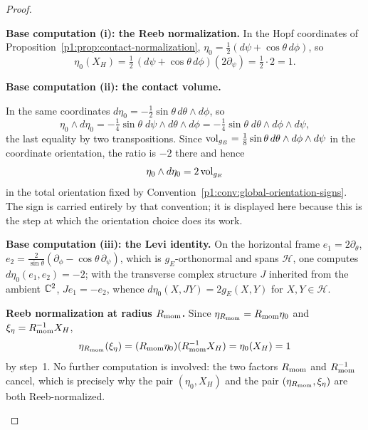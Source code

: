 \documentclass[11pt]{article}
\begin{document}
\begin{proof}

\begin{proofsteps}
\item \textbf{Base computation (i): the Reeb normalization.}
In the Hopf coordinates of Proposition~\ref{p1:prop:contact-normalization},
\(\eta_0=\tfrac12(d\psi+\cos\theta\,d\phi)\), so
\[
  \eta_0(X_H)=\tfrac12\,(d\psi+\cos\theta\,d\phi)(2\partial_\psi)=\tfrac12\cdot2=1 .
\]

\item \textbf{Base computation (ii): the contact volume.}\par
In the same coordinates \(d\eta_0=-\tfrac12\sin\theta\,d\theta\wedge d\phi\),
so
\[
  \eta_0\wedge d\eta_0
  =-\tfrac14\sin\theta\;d\psi\wedge d\theta\wedge d\phi
  =-\tfrac14\sin\theta\;d\theta\wedge d\phi\wedge d\psi ,
\]
the last equality by two transpositions.  Since
\(\operatorname{vol}_{g_E}=\tfrac18\sin\theta\,d\theta\wedge d\phi\wedge d\psi\) in the
coordinate orientation, the ratio is \(-2\) there and hence
\[
  \eta_0\wedge d\eta_0=2\operatorname{vol}_{g_E}
\]
in the total orientation fixed by
Convention~\ref{p1:conv:global-orientation-signs}.  The sign is carried
entirely by that convention; it is displayed here because this is the step at
which the orientation choice does its work.

\item \textbf{Base computation (iii): the Levi identity.}
On the horizontal frame
\(e_1=2\partial_\theta\), \(e_2=\tfrac{2}{\sin\theta}(\partial_\phi-\cos\theta\,\partial_\psi)\),
which is \(g_E\)-orthonormal and spans \(\mathcal H\), one computes
\(d\eta_0(e_1,e_2)=-2\); with the transverse complex structure \(J\) inherited
from the ambient \(\mathbb{C}^2\), \(Je_1=-e_2\), whence
\(d\eta_0(X,JY)=2g_E(X,Y)\) for \(X,Y\in\mathcal H\).

\item \textbf{Reeb normalization at radius \(R_{\mathrm{mom}}\).}
Since \(\eta_{R_{\mathrm{mom}}}=R_{\mathrm{mom}}\eta_0\) and \(\xi_\eta=R_{\mathrm{mom}}^{-1}X_H\),
\[
  \eta_{R_{\mathrm{mom}}}(\xi_\eta)
  =(R_{\mathrm{mom}}\eta_0)(R_{\mathrm{mom}}^{-1}X_H)
  =\eta_0(X_H)=1
\]
by step~1.  No further computation is involved: the two factors
\(R_{\mathrm{mom}}\) and \(R_{\mathrm{mom}}^{-1}\) cancel, which is precisely why the pair
\((\eta_0,X_H)\) and the pair \((\eta_{R_{\mathrm{mom}}},\xi_\eta)\) are both
Reeb-normalized.


\end{proofsteps}
\end{proof}
\end{document}
